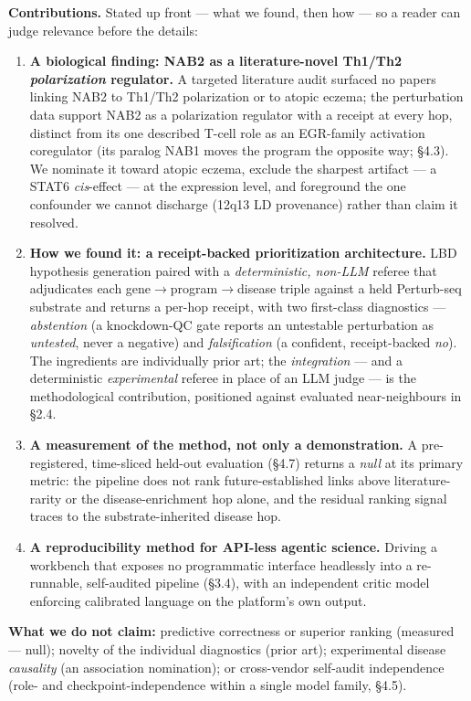 \noindent \textbf{Contributions.} Stated up front --- what we found, then how --- so a reader can judge
relevance before the details:
\begin{enumerate}
\tightlist
\item \textbf{A biological finding: NAB2 as a literature-novel Th1/Th2 \emph{polarization} regulator.} A targeted
  literature audit surfaced no papers linking NAB2 to Th1/Th2 polarization or to atopic eczema; the perturbation
  data support NAB2 as a polarization regulator with a receipt at every hop, distinct from its one described
  T-cell role as an EGR-family activation coregulator (its paralog NAB1 moves the program the opposite way;
  \S{}4.3). We nominate it toward atopic eczema, exclude the sharpest artifact --- a STAT6 \emph{cis}-effect ---
  at the expression level, and foreground the one confounder we cannot discharge (12q13 LD provenance) rather
  than claim it resolved.
\item \textbf{How we found it: a receipt-backed prioritization architecture.} LBD hypothesis generation paired
  with a \emph{deterministic, non-LLM} referee that adjudicates each gene$\rightarrow$program$\rightarrow$disease
  triple against a held Perturb-seq substrate and returns a per-hop receipt, with two first-class diagnostics
  --- \emph{abstention} (a knockdown-QC gate reports an untestable perturbation as \emph{untested}, never a
  negative) and \emph{falsification} (a confident, receipt-backed \emph{no}). The ingredients are individually
  prior art; the \emph{integration} --- and a deterministic \emph{experimental} referee in place of an LLM
  judge --- is the methodological contribution, positioned against evaluated near-neighbours in \S{}2.4.
\item \textbf{A measurement of the method, not only a demonstration.} A pre-registered, time-sliced held-out
  evaluation (\S{}4.7) returns a \emph{null} at its primary metric: the pipeline does not rank future-established
  links above literature-rarity or the disease-enrichment hop alone, and the residual ranking signal traces to
  the substrate-inherited disease hop.
\item \textbf{A reproducibility method for API-less agentic science.} Driving a workbench that exposes no
  programmatic interface headlessly into a re-runnable, self-audited pipeline (\S{}3.4), with an independent
  critic model enforcing calibrated language on the platform's own output.
\end{enumerate}
\noindent \textbf{What we do not claim:} predictive correctness or superior ranking (measured --- null);
novelty of the individual diagnostics (prior art); experimental disease \emph{causality} (an association
nomination); or cross-vendor self-audit independence (role- and checkpoint-independence within a single model
family, \S{}4.5).

